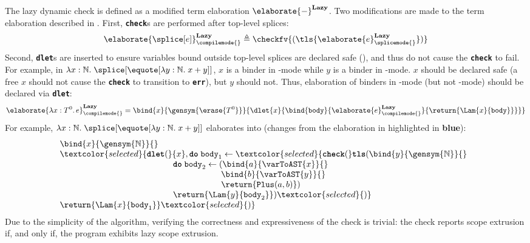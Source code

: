 The lazy dynamic check is defined as a modified term elaboration ${\elaborate{-}}^{\textbf{Lazy}}$. Two modifications are made to the term elaboration described in . First, \textbf{\texttt{check}}s are performed after top-level splices:
\[\elaborate{\splice[e]}_{\compilemode{}}^{\textbf{Lazy}} \triangleq {\checkfv{(\tls{\elaborate{e}_{\splicemode{}}^{\textbf{Lazy}}})}}\]
Second, \textbf{\texttt{dlet}}s are inserted to ensure variables bound outside top-level splices are declared safe (), and thus do not cause the \textbf{\texttt{check}} to fail. For example, in $\lambda x:\mathbb{N}. \; \splice[{\equote[\lambda{y}: \mathbb{N}. \; x+y]}]$, $x$ is a binder in \compilemode{}-mode while $y$ is a binder in \quotemode{}-mode. $x$ should be declared safe (a free $x$ should not cause the \textbf{\texttt{check}} to transition to \textbf{\texttt{err}}), but $y$ should not. Thus, elaboration of binders in \compilemode{}-mode (but not \quotemode{}-mode) should be declared via \textbf{\texttt{dlet}}:
{
  \footnotesize
\[\elaborate{\lambda x: T^0. \, e}_{\compilemode{}}^{\textbf{Lazy}} = \bind{x}{\gensym{\erase{T^0}}}{ \dlet{x}{\bind{\texttt{body}}{\elaborate{e}_{\compilemode{}}^\textbf{Lazy}}{\return{\Lam{x}{\texttt{body}}}}}}\]
}
For example, $\lambda x:\mathbb{N}. \; \splice[{\equote[\lambda{y}: \mathbb{N}. \; x+y]}]$ elaborates into (changes from the elaboration in  highlighted in \textbf{\textcolor{selected}{blue}}):
{
\[\begin{array}{@{}l}
  \bind{x}{\gensym{\mathbb{N}}}{} \\
  \textcolor{selected}{\textbf{\texttt{dlet}}(}{x}, \textbf{\texttt{do}} \; {\texttt{body}_1} \leftarrow \textcolor{selected}{\textbf{\texttt{check}}(}\textbf{\texttt{tls}}({\bind{y}{\gensym{\mathbb{N}}}{}} \\
    \quad\quad\quad\quad\quad\quad\quad
    \quad\quad\quad\quad\quad\quad\,\,
    \textbf{\texttt{do}}\;{\texttt{body}_2} \leftarrow {(\bind{a}{\varToAST{x}}{}}\\
    \quad\quad\quad\quad\quad\quad\quad\quad
    \quad\quad\quad\quad\quad\quad\quad\quad
    \quad\quad\quad
    \bind{b}{\varToAST{y}}{}\\
    \quad\quad\quad\quad\quad\quad\quad\quad
    \quad\quad\quad\quad\quad\quad\quad\quad
    \quad\quad\quad
    \return{\texttt{Plus}(a, b)})\\
    \quad\quad\quad\quad\quad\quad\quad
    \quad\quad\quad\quad\quad\quad\,\,
    \return{\Lam{y}{\texttt{body}_2}})\textcolor{selected}{)}\\
  {\return{\Lam{x}{\texttt{body}_1}}}\textcolor{selected}{)}
\end{array}\]
}
Due to the simplicity of the algorithm, verifying the correctness and expressiveness of the check is trivial: the check reports scope extrusion if, and only if, the program exhibits lazy scope extrusion.

